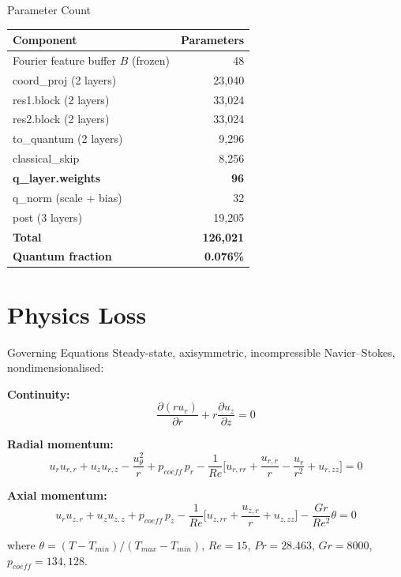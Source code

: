 \documentclass[aspectratio=169]{beamer}
\begin{document}
\begin{frame}{Parameter Count}
\begin{table}
\centering
\small
\begin{tabular}{lr}
\toprule
Component & Parameters \\
\midrule
Fourier feature buffer $B$ (frozen) & 48 \\
coord\_proj (2 layers) & 23,040 \\
res1.block (2 layers) & 33,024 \\
res2.block (2 layers) & 33,024 \\
to\_quantum (2 layers) & 9,296 \\
classical\_skip & 8,256 \\
\textbf{q\_layer.weights} & \textbf{96} \\
q\_norm (scale + bias) & 32 \\
post (3 layers) & 19,205 \\
\midrule
\textbf{Total} & \textbf{126,021} \\
\textbf{Quantum fraction} & \textbf{0.076\%} \\
\bottomrule
\end{tabular}
\end{table}
\end{frame}

\section{Physics Loss}

\begin{frame}{Governing Equations}
Steady-state, axisymmetric, incompressible Navier--Stokes, nondimensionalised:

\small
\textbf{Continuity:}
\[ \frac{\partial(r u_r)}{\partial r} + r\frac{\partial u_z}{\partial z} = 0 \]

\textbf{Radial momentum:}
\[ u_r u_{r,r} + u_z u_{r,z} - \frac{u_\theta^2}{r} + p_{coeff}\, p_r - \frac{1}{Re}\Big[u_{r,rr} + \frac{u_{r,r}}{r} - \frac{u_r}{r^2} + u_{r,zz}\Big] = 0 \]

\textbf{Axial momentum:}
\[ u_r u_{z,r} + u_z u_{z,z} + p_{coeff}\, p_z - \frac{1}{Re}\Big[u_{z,rr} + \frac{u_{z,r}}{r} + u_{z,zz}\Big] - \frac{Gr}{Re^2}\theta = 0 \]

where $\theta = (T-T_{min})/(T_{max}-T_{min})$, $Re=15$, $Pr=28.463$, $Gr=8000$, $p_{coeff}=134{,}128$.
\end{frame}
\end{document}
